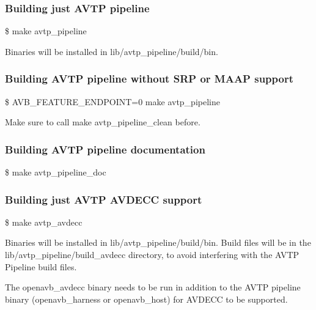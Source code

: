 \subsubsection*{Building just A\+V\+TP pipeline}


\begin{DoxyItemize}
\item \$ make avtp\+\_\+pipeline
\end{DoxyItemize}

Binaries will be installed in lib/avtp\+\_\+pipeline/build/bin.

\subsubsection*{Building A\+V\+TP pipeline without S\+RP or M\+A\+AP support}


\begin{DoxyItemize}
\item \$ A\+V\+B\+\_\+\+F\+E\+A\+T\+U\+R\+E\+\_\+\+E\+N\+D\+P\+O\+I\+NT=0 make avtp\+\_\+pipeline
\end{DoxyItemize}

Make sure to call {\ttfamily make avtp\+\_\+pipeline\+\_\+clean} before.

\subsubsection*{Building A\+V\+TP pipeline documentation}


\begin{DoxyItemize}
\item \$ make avtp\+\_\+pipeline\+\_\+doc
\end{DoxyItemize}

\subsubsection*{Building just A\+V\+TP A\+V\+D\+E\+CC support}


\begin{DoxyItemize}
\item \$ make avtp\+\_\+avdecc
\end{DoxyItemize}

Binaries will be installed in lib/avtp\+\_\+pipeline/build/bin. Build files will be in the lib/avtp\+\_\+pipeline/build\+\_\+avdecc directory, to avoid interfering with the A\+V\+TP Pipeline build files.

The openavb\+\_\+avdecc binary needs to be run in addition to the A\+V\+TP pipeline binary (openavb\+\_\+harness or openavb\+\_\+host) for A\+V\+D\+E\+CC to be supported.

